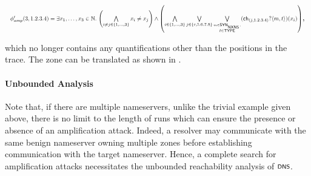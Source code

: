 {\begin{example}
\begin{equation*}\label{eqn:amp-prop}
\resizebox{\textwidth}{!}{$\phi_{amp}'(3,1.2.3.4)  = \exists x_1,\ldots,x_{3}\in\nat.\, \left(\bigwedge\limits_{i\neq j \in \{1,\ldots ,3 \}} x_i \neq x_j\right)
	 \wedge \left( \bigwedge\limits_{i\in \{1,\ldots , 3 \}}\bigvee\limits_{j \in \{r,5.6.7.8\}}\bigvee\limits_{\stackrel{m \in \scrsf{syn}\subsub{\scrsf{nxns}},}{t \in \scrsf{type}}} (\ch_{(j,1.2.3.4)}?\tup{m,t})(x_i)\right)$},
\end{equation*}


\noindent which no longer contains any quantifications other than the positions in the trace. The zone can be translated as shown in .
\end{example}
}

\paragraph{Unbounded Analysis}
Note that, if there are multiple nameservers, unlike the trivial example given above, there is no limit to the length of runs which can ensure the presence or absence of an amplification attack. Indeed, a resolver may communicate with the same benign nameserver owning multiple zones before establishing communication with the target nameserver. Hence, a complete search for amplification attacks necessitates the unbounded reachability analysis of $\scrsf{dns}$.


